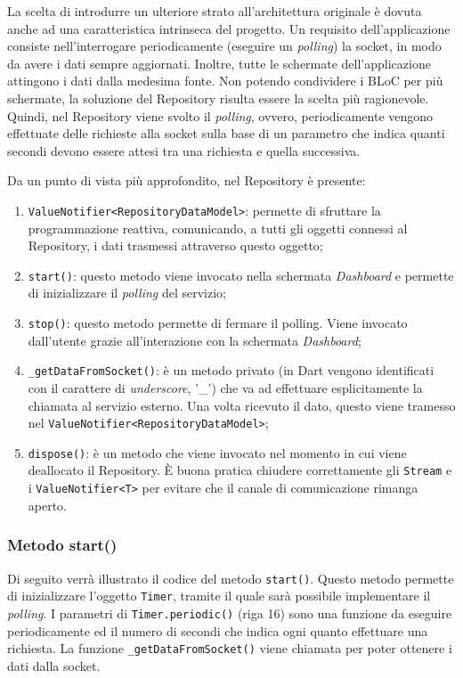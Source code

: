 La scelta di introdurre un ulteriore strato all'architettura originale è dovuta anche ad una caratteristica intrinseca del progetto. Un requisito dell'applicazione consiste nell'interrogare periodicamente (eseguire un \textit{polling}) la socket, in modo da avere i dati sempre aggiornati. Inoltre, tutte le schermate dell'applicazione attingono i dati dalla medesima fonte. Non potendo condividere i BLoC per più schermate, la soluzione del Repository risulta essere la scelta più ragionevole. Quindi, nel Repository viene svolto il \textit{polling}, ovvero, periodicamente vengono effettuate delle richieste alla socket sulla base di un parametro che indica quanti secondi devono essere attesi tra una richiesta e quella successiva.

Da un punto di vista più approfondito, nel Repository è presente:
\begin{enumerate}
	\item \verb|ValueNotifier<RepositoryDataModel>|: permette di sfruttare la programmazione reattiva, comunicando, a tutti gli oggetti connessi al Repository, i dati trasmessi attraverso questo oggetto;
	\item \verb|start()|: questo metodo viene invocato nella schermata \textit{Dashboard} e permette di inizializzare il \textit{polling} del servizio;
	\item \verb|stop()|: questo metodo permette di fermare il polling. Viene invocato dall'utente grazie all'interazione con la schermata \textit{Dashboard};
	\item \verb|_getDataFromSocket()|: è un metodo privato (in Dart vengono identificati con il carattere di \textit{underscore}, '\_') che va ad effettuare esplicitamente la chiamata al servizio esterno. Una volta ricevuto il dato, questo viene tramesso nel \verb|ValueNotifier<RepositoryDataModel>|;
	\item \verb|dispose()|: è un metodo che viene invocato nel momento in cui viene deallocato il Repository. È buona pratica chiudere correttamente gli \verb|Stream| e i \verb|ValueNotifier<T>| per evitare che il canale di comunicazione rimanga aperto.
\end{enumerate}

\subsubsection{Metodo start()}
Di seguito verrà illustrato il codice del metodo \verb|start()|. Questo metodo permette di inizializzare l'oggetto \verb|Timer|, tramite il quale sarà possibile implementare il \textit{polling}. I parametri di \verb|Timer.periodic()| (riga 16) sono una funzione da eseguire periodicamente ed il numero di secondi che indica ogni quanto effettuare una richiesta. La funzione \verb|_getDataFromSocket()| viene chiamata per poter ottenere i dati dalla socket.

